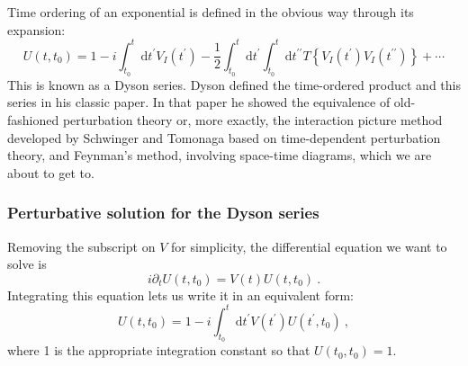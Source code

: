 \documentclass[11pt,a4paper]{article}
\newcommand{\dif}{\mathrm{d}}
\begin{document}
Time ordering of an exponential is defined in the obvious way through its expansion:
\begin{equation}
U(t, t_0) = 1 -i \int_{t_0}^t \dif t^\prime V_I(t^\prime) -\dfrac{1}{2} \int_{t_0}^t \dif t^\prime \int_{t_0}^t \dif t^{\prime \prime} T\left\{V_I(t^\prime) V_I( t^{\prime \prime}) \right\}  +\cdots
\end{equation}
This is known as a Dyson series. Dyson defined the time-ordered product and this series in his classic paper. In that paper he showed the equivalence of old-fashioned perturbation theory or, more exactly, the interaction picture method developed by Schwinger and Tomonaga based on time-dependent perturbation theory, and Feynman's method, involving space-time diagrams, which we are about to get to.


\subsubsection{Perturbative solution for the Dyson series}
Removing the subscript on $V$ for simplicity, the differential equation we want to solve is
\begin{equation}
i \partial_t U(t, t_0) = V(t) U(t, t_0) ~.
\end{equation}
Integrating this equation lets us write it in an equivalent form:
\begin{equation}
U(t, t_0) = 1 -i \int_{t_0}^t \dif t^\prime V(t^\prime) U(t^\prime, t_0) ~,
\end{equation}
where 1 is the appropriate integration constant so that $U(t_0,t_0) = 1$.
\end{document}

